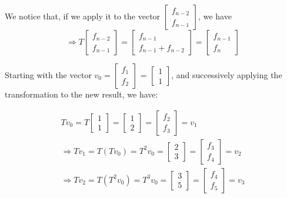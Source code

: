 \documentclass{article}
\begin{document}
We notice that, if we apply it to the vector $\begin{bmatrix}
    f_{n - 2} \\
        f_{n - 1}
\end{bmatrix}$, we have
\begin{equation*}
    \Rightarrow
    T \begin{bmatrix}
        f_{n - 2} \\
        f_{n - 1}
    \end{bmatrix} =
    \begin{bmatrix}
        f_{n - 1} \\
        f_{n - 1} + f_{n - 2}
    \end{bmatrix} =
    \begin{bmatrix}
        f_{n - 1} \\
        f_{n}
    \end{bmatrix}
\end{equation*}

Starting with the vector $v_0 = \begin{bmatrix}
    f_{1} \\
        f_{2}
\end{bmatrix}$ = $\begin{bmatrix}
    1 \\
    1
\end{bmatrix}$, and successively applying the transformation to the new result,
we have:

\begin{equation*}
    \begin{aligned}
    Tv_0 = T\begin{bmatrix}
        1 \\
        1
    \end{bmatrix} = \begin{bmatrix}
        1\\
        2
    \end{bmatrix}=\begin{bmatrix}
        f_2\\
        f_3
    \end{bmatrix} = v_1\\
    \Rightarrow
    Tv_1 = T(Tv_0) = T^2 v_0 =\begin{bmatrix}
        2\\
        3
    \end{bmatrix} = \begin{bmatrix}
        f_3\\
        f_4
    \end{bmatrix}  = v_2 \\
    \Rightarrow
    Tv_2 = T(T^2 v_0) = T^3 v_0 =\begin{bmatrix}
        3\\
        5
    \end{bmatrix} = \begin{bmatrix}
        f_4\\
        f_5
    \end{bmatrix}  = v_3
    \end{aligned}
\end{equation*}
\end{document}
